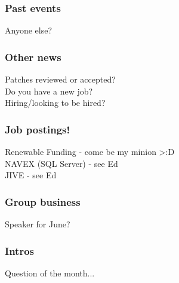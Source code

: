 \documentclass{beamer}
\begin{document}
\frame
{
  \frametitle{Past events}
  \begin{center}
Anyone else?\\
  \end{center}
}

\frame
{
  \frametitle{Other news}
  \begin{center}
Patches reviewed or accepted?\\
Do you have a new job?\\
Hiring/looking to be hired?\\
  \end{center}
}

\frame
{
  \frametitle{Job postings!}
  \begin{center}
Renewable Funding - come be my minion >:D\\
\vspace{5 mm}
NAVEX (SQL Server) - see Ed\\
\vspace{5 mm}
JIVE - see Ed \\
  \end{center}
}

\frame
{
  \frametitle{Group business}
  \begin{center}
Speaker for June?\\
  \end{center}
}

\frame
{
  \frametitle{Intros}
  \begin{center}
Question of the month...\\
  \end{center}
}
\end{document}
